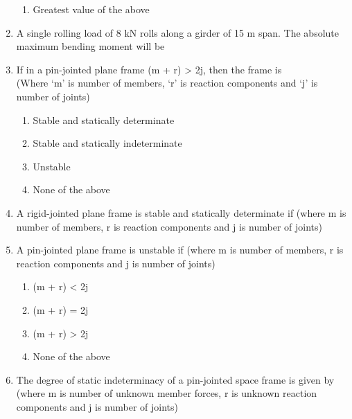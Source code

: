 \documentclass[11pt,a4paper]{article}
\begin{document}
\begin{enumerate}
\begin{enumerate}[label=\Alph*.]
\item{Greatest value of the above}
\end{enumerate}
\item{A single rolling load of 8 kN rolls along a girder of 15 m span. The absolute maximum bending moment will be}
\\
\item{If in a pin-jointed plane frame (m + r) > 2j, then the frame is  \\
(Where `m' is number of members, `r' is reaction components and `j' is number of joints)
}
\begin{enumerate}[label=\Alph*.]
\item{Stable and statically determinate}
\item{Stable and statically indeterminate}
\item{Unstable}
\item{None of the above}
\end{enumerate}
\item{A rigid-jointed plane frame is stable and statically determinate if (where m is number of members, r is reaction components and j is number of joints)}
\\
\item{A pin-jointed plane frame is unstable if (where m is number of members, r is reaction components and j is number of joints)}
\begin{enumerate}[label=\Alph*.]
\item{(m + r) < 2j}
\item{(m + r) = 2j}
\item{(m + r) > 2j}
\item{None of the above}
\end{enumerate}
\item{The degree of static indeterminacy of a pin-jointed space frame is given by (where m is number of unknown member forces, r is unknown reaction components and j is number of joints)}

\end{enumerate}
\end{document}
